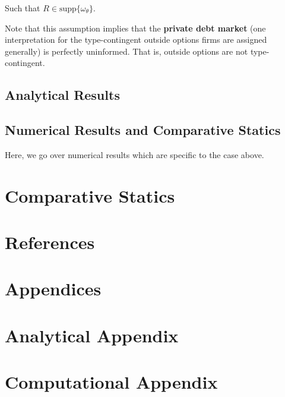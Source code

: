 \documentclass{article}
\theoremstyle{definition}
\begin{document}
Such that $R \in \text{supp}\{\omega_\theta\}$. 

Note that this assumption implies that the \textbf{private debt market} (one interpretation for the type-contingent outside options firms are assigned generally) is perfectly uninformed. That is, outside options are not type-contingent.

\subsection{Analytical Results}

\subsection{Numerical Results and Comparative Statics}

Here, we go over numerical results which are specific to the case above. 

\newpage

\section{Comparative Statics}

\newpage

\section{References}

\newpage

\appendix
{}
\section*{Appendices}
\section{Analytical Appendix}
\section{Computational Appendix}
\end{document}
